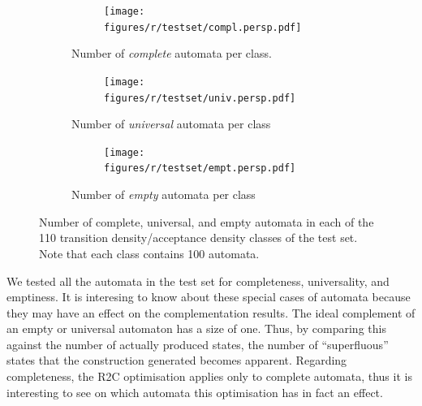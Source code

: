 \renewcommand{\tabcolsep}{0.05cm}   %
\renewcommand{\arraystretch}{1.05}
\begin{figure}[htb!]
  \centering
  \begin{subfigure}{\textwidth}
    \begin{subtable}{0.47\textwidth}
    
    \end{subtable}
    \hfill
    \begin{subfigure}{0.52\textwidth}
    \texttt{[image: figures/r/testset/compl.persp.pdf]}
    \end{subfigure}
  \caption{Number of \textit{complete} automata per class.}
  \end{subfigure}

 \begin{subfigure}{\textwidth}
    \begin{subtable}{0.47\textwidth}
    
    \end{subtable}
    \hfill
    \begin{subfigure}{0.52\textwidth}
    \texttt{[image: figures/r/testset/univ.persp.pdf]}
    \end{subfigure}
  \caption{Number of \textit{universal} automata per class}
  \end{subfigure}

  \begin{subfigure}{\textwidth}
    \begin{subtable}{0.47\textwidth}
    
    \end{subtable}
    \hfill
    \begin{subfigure}{0.52\textwidth}
    \texttt{[image: figures/r/testset/empt.persp.pdf]}
    \end{subfigure}
  \caption{Number of \textit{empty} automata per class}
  \end{subfigure}
\caption{Number of complete, universal, and empty automata in each of the 110 transition density/acceptance density classes of the \goal{} test set. Note that each class contains 100 automata.}
\label{testset_analysis}
\end{figure}
\tablestyle  %

We tested all the automata in the \goal{} test set for completeness, universality, and emptiness. It is interesing to know about these special cases of automata because they may have an effect on the complementation results. The ideal complement of an empty or universal automaton has a size of one. Thus, by comparing this against the number of actually produced states, the number of ``superfluous'' states that the construction generated becomes apparent. Regarding completeness, the R2C optimisation applies only to complete automata, thus it is interesting to see on which automata this optimisation has in fact an effect.

